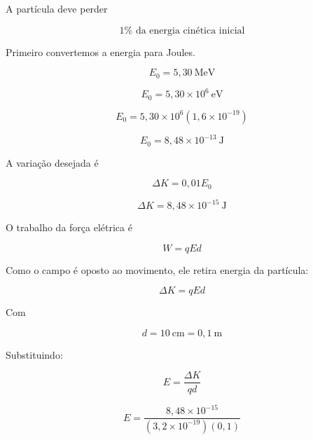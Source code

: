\documentclass[a4paper,12pt]{article}
\begin{document}
A partícula deve perder

\begin{equation}
1\% \text{ da energia cinética inicial}
\end{equation}

Primeiro convertemos a energia para Joules.

\begin{equation}
E_0 = 5{,}30 \ \text{MeV}
\end{equation}

\begin{equation}
E_0 = 5{,}30 \times 10^6 \ \text{eV}
\end{equation}

\begin{equation}
E_0 = 5{,}30\times10^6 (1{,}6\times10^{-19})
\end{equation}

\begin{equation}
E_0 = 8{,}48\times10^{-13} \ \text{J}
\end{equation}

A variação desejada é

\begin{equation}
\Delta K = 0{,}01E_0
\end{equation}

\begin{equation}
\Delta K = 8{,}48\times10^{-15} \ \text{J}
\end{equation}

O trabalho da força elétrica é

\begin{equation}
W = qEd
\end{equation}

Como o campo é oposto ao movimento, ele retira energia da partícula:

\begin{equation}
\Delta K = qEd
\end{equation}

Com

\begin{equation}
d = 10 \ \text{cm} = 0{,}1 \ \text{m}
\end{equation}

Substituindo:

\begin{equation}
E = \frac{\Delta K}{qd}
\end{equation}

\begin{equation}
E = \frac{8{,}48\times10^{-15}}
{(3{,}2\times10^{-19})(0{,}1)}
\end{equation}
\end{document}
